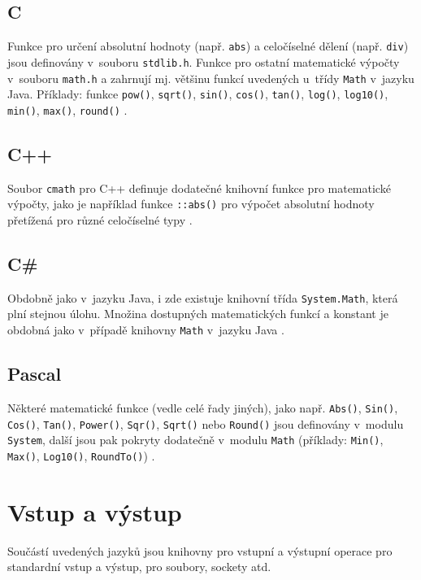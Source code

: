 \documentclass[czech,BP]{thesiskiv}
\begin{document}
\subsection{C}
Funkce pro určení absolutní hodnoty (např. \texttt{abs}) a celočíselné dělení (např. \texttt{div}) jsou definovány v~souboru \texttt{stdlib.h}. Funkce pro ostatní matematické výpočty v~souboru \texttt{math.h} a zahrnují mj. většinu funkcí uvedených u~třídy \texttt{Math} v~jazyku Java. Příklady: funkce \texttt{pow()}, \texttt{sqrt()}, \texttt{sin()}, \texttt{cos()}, \texttt{tan()}, \texttt{log()}, \texttt{log10()}, \texttt{min()}, \texttt{max()}, \texttt{round()} \cite{cpp-guide-cstdlib, cpp-guide-cmath}.

\subsection{C++}
Soubor \texttt{cmath} pro C++ definuje dodatečné knihovní funkce pro matematické výpočty, jako je například funkce \texttt{::abs()} pro výpočet absolutní hodnoty přetížená pro různé celočíselné typy \cite{cpp-guide-cstdlib, cpp-guide-abs}.

\subsection{C\#}
Obdobně jako v~jazyku Java, i zde existuje knihovní třída \texttt{System.Math}, která plní stejnou úlohu. Množina dostupných matematických funkcí a konstant je obdobná jako v~případě knihovny \texttt{Math} v~jazyku Java \cite{cs-guide-math}.

\subsection{Pascal}
Některé matematické funkce (vedle celé řady jiných), jako např. \texttt{Abs()}, \texttt{Sin()}, \texttt{Cos()}, \texttt{Tan()}, \texttt{Power()}, \texttt{Sqr()}, \texttt{Sqrt()} nebo \texttt{Round()} jsou definovány v~modulu \texttt{System}, další jsou pak pokryty dodatečně v~modulu \texttt{Math} (příklady: \texttt{Min()}, \texttt{Max()}, \texttt{Log10()}, \texttt{RoundTo()}) \cite{pas-guide-system, pas-guide-math}.

\section{Vstup a výstup}
Součástí uvedených jazyků jsou knihovny pro vstupní a výstupní operace pro standardní vstup a výstup, pro soubory, sockety atd.
\end{document}
